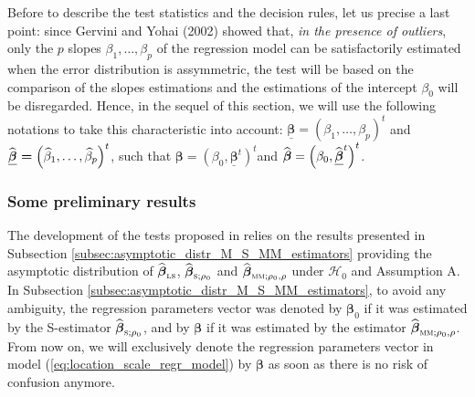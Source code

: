 Before to describe the test statistics and the decision rules, let us precise
a last point: since Gervini and Yohai (2002) showed that, \emph{in the
presence of outliers}, only the $p$ slopes $\beta_{1},\ldots,\beta_{p}$ of the
regression model can be satisfactorily estimated when the error distribution
is assymmetric, the test will be based on the comparison of the slopes
estimations and the estimations of the intercept $\beta_{0}$ will be
disregarded. Hence, in the sequel of this section, we will use the following
notations to take this characteristic into account: $\boldsymbol{\underline
{\boldsymbol\beta}=}\left(  \beta_{1},\ldots,\beta_{p}\right)  ^{t}$ and
$\boldsymbol{\underline{\sthat{\boldsymbol\beta}}=}\left(  \sthat{\beta
}_{1},\ldots,\sthat{\beta}_{p}\right)  ^{t}$, such that $\boldsymbol{\beta
}=\left(  \beta_{0},\boldsymbol{\underline{\boldsymbol\beta}}^{t}\right)
^{t}$and $\sthat{\boldsymbol\beta}=\left(  \beta_{0}%
,\boldsymbol{\underline{\sthat{\boldsymbol\beta}}}^{t}\right)  ^{t}$.

\subsubsection{Some preliminary results}

The development of the tests proposed in \citet{Dehon:2012}
relies on the results presented in Subsection
\ref{subsec:asymptotic_distr_M_S_MM_estimators} providing the asymptotic
distribution of $\sthat{\boldsymbol\beta}_{\stsc{LS}}$, $\widehat
{\boldsymbol\beta}_{\stsc{S};\rho_{0}}$ and $\sthat{\boldsymbol\beta%
}_{\stsc{MM};\rho_{0},\rho}$ under $\mathcal{H}_{0}$ and Assumption A. In
Subsection \ref{subsec:asymptotic_distr_M_S_MM_estimators}, to avoid any
ambiguity, the regression parameters vector was denoted by $\boldsymbol{\beta
}_{0}$ if it was estimated by the S-estimator $\sthat{\boldsymbol\beta%
}_{\stsc{S};\rho_{0}}$, and by $\boldsymbol\beta$ if it was estimated by
the  estimator $\sthat{\boldsymbol\beta}_{\stsc{MM};\rho_{0},\rho}$.
From now on, we will exclusively denote the regression parameters vector in
model (\ref{eq:location_scale_regr_model}) by $\boldsymbol\beta$ as soon as
there is no risk of confusion anymore.


